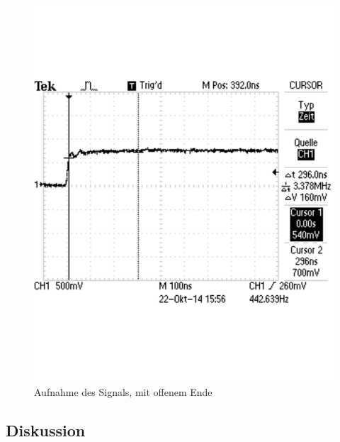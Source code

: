 \documentclass[12pt,a4paper]{article}
\begin{document}
\begin{figure}[H] 
  \centering
    \includegraphics[scale = 0.5]{4_a.pdf}
  	\caption[Aufnahme des Signals, mit offenem Ende]{Aufnahme des Signals, mit offenem Ende}
  \label{fig:4_a}
\end{figure}

\subsection{Diskussion}
\end{document}
